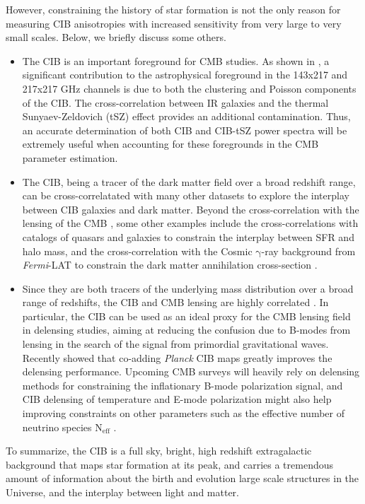 However, constraining the history of star formation is not the only reason for
measuring CIB anisotropies with increased sensitivity
from very large to very small scales. Below, we briefly discuss some others.
\begin{itemize}
\item The CIB is an important foreground for CMB studies. As shown in
\cite{planck2016like}, a significant contribution to the
astrophysical foreground in the 143x217 and 217x217 GHz channels is
due to both the clustering and Poisson components of the CIB.
The cross-correlation between IR galaxies and the thermal
Sunyaev-Zeldovich (tSZ) effect provides an additional contamination.
Thus, an accurate determination of both CIB and CIB-tSZ power
spectra will be extremely useful when accounting for these foregrounds
in the CMB parameter estimation.
\item The CIB, being a tracer of the dark matter field over a broad redshift range,
can be cross-correlatated with many other datasets to explore
the interplay between CIB galaxies and dark matter. Beyond the
cross-correlation with the lensing of the CMB
\citep{planckXVIII,holder2013}, some other examples include the cross-correlations
with catalogs of quasars \citep{wang2015} and
galaxies \citep{serra2014} to constrain the interplay between
SFR and halo mass, and the cross-correlation with the Cosmic
$\mathrm{\gamma}$-ray background from {\it Fermi}-LAT
\citep{fermi2016} to constrain the dark matter annihilation
cross-section \citep{cooray2016}.
\item Since they are both tracers of the underlying mass distribution over
a broad range of redshifts, the CIB and CMB lensing are highly correlated
\citep{planckXVIII}. In particular, the CIB can be used as
an ideal proxy for the CMB lensing field in delensing studies, aiming at
reducing the confusion due to B-modes from lensing in the search of the
signal from primordial gravitational waves.
Recently \cite{sherwin2015,larsen2016} showed that co-adding {\it Planck} CIB maps
greatly improves the delensing performance. Upcoming CMB surveys
will heavily rely on delensing methods for constraining the
inflationary B-mode polarization signal, and CIB delensing of temperature and E-mode
polarization might also help improving constraints on other parameters such as the effective
number of neutrino species $\mathrm{N_{eff}}$ \citep{larsen2016}.
\end{itemize}
To summarize, the CIB is a full sky, bright, high redshift extragalactic
background that maps star formation at its peak, and carries
a tremendous amount of information about the birth and
evolution large scale structures in the Universe, and the interplay
between light and matter.

